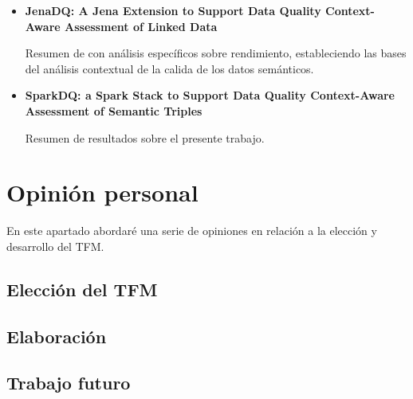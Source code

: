 \begin{itemize}
\item \textbf{JenaDQ: A Jena Extension to Support Data Quality Context-Aware Assessment
  of Linked Data}

Resumen de \cite{PFC} con análisis específicos sobre rendimiento, estableciendo
las bases del análisis contextual de la calida de los datos semánticos. 

\item \textbf{SparkDQ: a Spark Stack to Support Data Quality Context-Aware
  Assessment of Semantic Triples}

Resumen de resultados sobre el presente trabajo. 
\end{itemize}


\section{Opinión personal}
En este apartado abordaré una serie de opiniones en relación a la elección y
desarrollo del \acs{TFM}.

\subsection{Elección del \acs{TFM}}

\subsection{Elaboración}

\subsection{Trabajo futuro}
